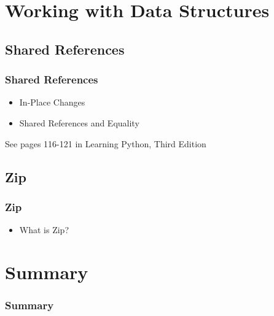 \documentclass{beamer}
\begin{document}
\section{Working with Data Structures}
\subsection{Shared References}
\begin{frame}[fragile]
\frametitle{Shared References}
\begin{itemize}
\item{In-Place Changes}
\item{Shared References and Equality}
\end{itemize}
\tiny{See pages 116-121 in Learning Python, Third Edition}
\end{frame}

\subsection{Zip}
\begin{frame}[fragile]
\frametitle{Zip}
\begin{itemize}
\item{What is Zip?}
\end{itemize}
\end{frame}

\section{Summary}
\begin{frame}[fragile]
\frametitle{Summary}
\end{frame}
\end{document}
